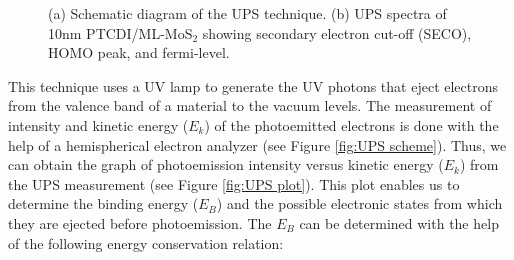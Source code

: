 \documentclass[12pt]{article}
\begin{document}
\begin{figure}[H]
\centering
{}
\caption{(a) Schematic diagram of the UPS technique. (b) UPS spectra of 10nm PTCDI/ML-MoS$_2$ showing secondary electron cut-off (SECO), HOMO peak, and fermi-level.}
\label{fig:UPS method}
\end{figure}


This technique uses a UV lamp to generate the UV photons that eject electrons from the valence band of a material to the vacuum levels. The measurement of intensity and kinetic energy ($E_k$) of the photoemitted electrons is done with the help of a hemispherical electron analyzer (see Figure \ref{fig:UPS scheme}). Thus, we can obtain the graph of photoemission intensity versus kinetic energy ($E_k$) from the UPS measurement (see Figure \ref{fig:UPS plot}). This plot enables us to determine the binding energy ($E_B$) and the possible electronic states from which they are ejected before photoemission. The $E_B$ can be determined with the help of the following energy conservation relation:
\end{document}
